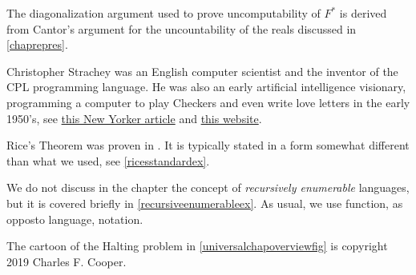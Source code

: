 The diagonalization argument used to prove uncomputability of \(F^*\) is
derived from Cantor's argument for the uncountability of the reals
discussed in \cref{chaprepres}.

Christopher Strachey was an English computer scientist and the inventor
of the CPL programming language. He was also an early artificial
intelligence visionary, programming a computer to play Checkers and even
write love letters in the early 1950's, see
\href{https://www.newyorker.com/tech/elements/christopher-stracheys-nineteen-fifties-love-machine}{this
New Yorker article} and
\href{http://www.alpha60.de/art/love_letters/}{this website}.

Rice's Theorem was proven in \cite{rice1953classes}. It is typically
stated in a form somewhat different than what we used, see
\cref{ricesstandardex}.

We do not discuss in the chapter the concept of \emph{recursively
enumerable} languages, but it is covered briefly in
\cref{recursiveenumerableex}. As usual, we use function, as opposto
language, notation.

The cartoon of the Halting problem in \cref{universalchapoverviewfig} is
copyright 2019 Charles F. Cooper.
